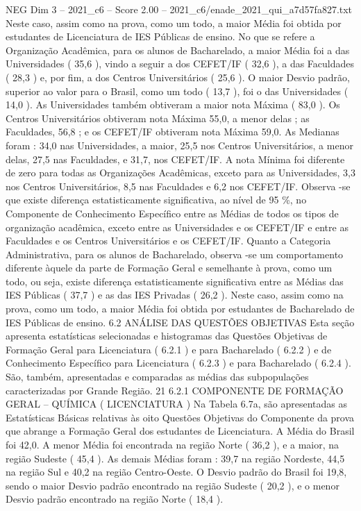 \begin{textsample}{NEG Dim 3 – 2021\_c6 – Score 2.00 – 2021\_c6/enade\_2021\_qui\_a7d57fa827.txt}
Neste caso, assim como na prova, como um todo, a maior Média foi obtida por estudantes de Licenciatura de IES Públicas de ensino.
No que se refere a Organização Acadêmica, para os alunos de Bacharelado, a maior Média foi a das Universidades ( 35,6 ), vindo a seguir a dos CEFET/IF ( 32,6 ), a das Faculdades ( 28,3 ) e, por fim, a dos Centros Universitários ( 25,6 ).
O maior Desvio padrão, superior ao valor para o Brasil, como um todo ( 13,7 ), foi o das Universidades ( 14,0 ).
As Universidades também obtiveram a maior nota Máxima ( 83,0 ).
Os Centros Universitários obtiveram nota Máxima 55,0, a menor delas ; as Faculdades, 56,8 ; e os CEFET/IF obtiveram nota Máxima 59,0.
As Medianas foram : 34,0 nas Universidades, a maior, 25,5 nos Centros Universitários, a menor delas, 27,5 nas Faculdades, e 31,7, nos CEFET/IF.
A nota Mínima foi diferente de zero para todas as Organizações Acadêmicas, exceto para as Universidades, 3,3 nos Centros Universitários, 8,5 nas Faculdades e 6,2 nos CEFET/IF.
Observa -se que existe diferença estatisticamente significativa, ao nível de 95 \%, no Componente de Conhecimento Específico entre as Médias de todos os tipos de organização acadêmica, exceto entre as Universidades e os CEFET/IF e entre as Faculdades e os Centros Universitários e os CEFET/IF.
Quanto a Categoria Administrativa, para os alunos de Bacharelado, observa -se um comportamento diferente àquele da parte de Formação Geral e semelhante à prova, como um todo, ou seja, existe diferença estatisticamente significativa entre as Médias das IES Públicas ( 37,7 ) e as das IES Privadas ( 26,2 ).
Neste caso, assim como na prova, como um todo, a maior Média foi obtida por estudantes de Bacharelado de IES Públicas de ensino. 6.2 ANÁLISE DAS QUESTÕES OBJETIVAS Esta seção apresenta estatísticas selecionadas e histogramas das Questões Objetivas de Formação Geral para Licenciatura ( 6.2.1 ) e para Bacharelado ( 6.2.2 ) e de Conhecimento Específico para Licenciatura ( 6.2.3 ) e para Bacharelado ( 6.2.4 ).
São, também, apresentadas e comparadas as médias das subpopulações caracterizadas por Grande Região. 21 6.2.1 COMPONENTE DE FORMAÇÃO GERAL – QUÍMICA ( LICENCIATURA ) Na Tabela 6.7a, são apresentadas as Estatísticas Básicas relativas às oito Questões Objetivas do Componente da prova que abrange a Formação Geral dos estudantes de Licenciatura.
A Média do Brasil foi 42,0.
A menor Média foi encontrada na região Norte ( 36,2 ), e a maior, na região Sudeste ( 45,4 ).
As demais Médias foram : 39,7 na região Nordeste, 44,5 na região Sul e 40,2 na região Centro-Oeste.
O Desvio padrão do Brasil foi 19,8, sendo o maior Desvio padrão encontrado na região Sudeste ( 20,2 ), e o menor Desvio padrão encontrado na região Norte ( 18,4 ).

\end{textsample}
